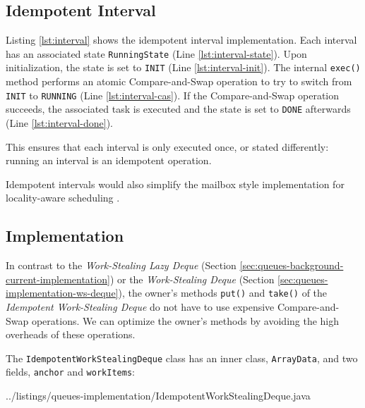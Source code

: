 \subsection{Idempotent Interval}
\label{sec:queues-implementation-idempotent-ws-deque-interval}

Listing \ref{lst:interval} shows the idempotent interval
implementation. Each interval has an associated state
\lstinline!RunningState! (Line \ref{lst:interval-state}). Upon
initialization, the state is set to \lstinline!INIT! (Line
\ref{lst:interval-init}). The internal \lstinline!exec()!  method
performs an atomic Compare-and-Swap operation to try to switch from
\lstinline!INIT! to \lstinline!RUNNING! (Line
\ref{lst:interval-cas}). If the Compare-and-Swap operation succeeds,
the associated task is executed and the state is set to
\lstinline!DONE! afterwards (Line \ref{lst:interval-done}).



This ensures that each interval is only executed once, or stated
differently: running an interval is an idempotent operation.

Idempotent intervals would also simplify the mailbox style
implementation for locality-aware scheduling \cite{Acar2002}.

\subsection{Implementation}
\label{sec:queues-implementation-idempotent-ws-deque-implementation}

In contrast to the \emph{Work-Stealing Lazy Deque} (Section
\ref{sec:queues-background-current-implementation}) or the
\emph{Work-Stealing Deque} (Section
\ref{sec:queues-implementation-ws-deque}), the owner's methods
\lstinline!put()! and \lstinline!take()! of the \emph{Idempotent
  Work-Stealing Deque} do not have to use expensive Compare-and-Swap
operations. We can optimize the owner's methods by avoiding the high
overheads of these operations.

The \lstinline!IdempotentWorkStealingDeque! class has an inner class,
\lstinline!ArrayData!, and two fields, \lstinline!anchor! and
\lstinline!workItems!:


{
    ../listings/queues-implementation/IdempotentWorkStealingDeque.java
}

